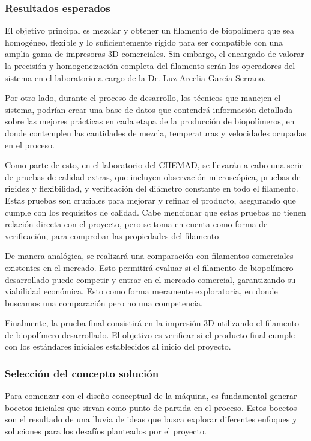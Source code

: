\documentclass[14pt,oneside]{extarticle} %
\begin{document}
\subsubsection{Resultados esperados}

El objetivo principal es mezclar y obtener un filamento de biopolímero que sea homogéneo, flexible y lo suficientemente rígido para ser compatible con una amplia gama de impresoras 3D comerciales. Sin embargo, el encargado de valorar la precisión y homogeneización completa del filamento serán los operadores del sistema en el laboratorio a cargo de la Dr. Luz Arcelia García Serrano.

Por otro lado, durante el proceso de desarrollo, los técnicos que manejen el sistema, podrían crear una base de datos que contendrá información detallada sobre las mejores prácticas en cada etapa de la producción de biopolímeros, en donde contemplen las cantidades de mezcla, temperaturas y velocidades ocupadas en el proceso. 

Como parte de esto, en el laboratorio del CIIEMAD, se llevarán a cabo una serie de pruebas de calidad extras, que incluyen observación microscópica, pruebas de rigidez y flexibilidad, y verificación del diámetro constante en todo el filamento. Estas pruebas son cruciales para mejorar y refinar el producto, asegurando que cumple con los requisitos de calidad. Cabe mencionar que estas pruebas no tienen relación directa con el proyecto, pero se toma en cuenta como forma de verificación, para comprobar las propiedades del filamento

De manera analógica, se realizará una comparación con filamentos comerciales existentes en el mercado. Esto permitirá evaluar si el filamento de biopolímero desarrollado puede competir y entrar en el mercado comercial, garantizando su viabilidad económica. Esto como forma meramente exploratoria, en donde buscamos una comparación pero no una competencia. 

Finalmente, la prueba final consistirá en la impresión 3D utilizando el filamento de biopolímero desarrollado. El objetivo es verificar si el producto final cumple con los estándares iniciales establecidos al inicio del proyecto. 



\subsubsection{Selección del concepto solución}

Para comenzar con el diseño conceptual de la máquina, es fundamental generar bocetos iniciales que sirvan como punto de partida en el proceso. Estos bocetos son el resultado de una lluvia de ideas que busca explorar diferentes enfoques y soluciones para los desafíos planteados por el proyecto. 
\end{document}
